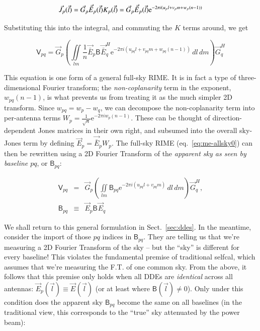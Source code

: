 \documentclass[]{aa}
\newcommand{\herm}{H}
\newcommand{\jones}[2]{\vec {#1}_{#2}}
\newcommand{\jonesT}[2]{\vec {#1}^{\herm}_{#2}}
\newcommand{\coh}[2]{\mathsf{{#1}}_{{#2}}}
\begin{document}
\[
\jones{J}{p}(\vec l) = \jones{G}{p}\jones{\bar E}{p}(\vec l) K_p(\vec l) = \jones{G}{p}\jones{\bar E}{p}(\vec l) {\rm e}^{-2\pi i(u_p l+v_p m+w_p (n-1))}
\]

Substituting this into the integral, and commuting the $K$ terms around, we get

\begin{equation}\label{eq:me-allsky0}
\coh{V}{pq} = \jones{G}{p} \left( \iint\limits_{lm} \frac{1}{n} \jones{\bar E}{p} \coh{B}{} \jonesT{\bar E}{q} \mathrm{e} ^{-2\pi i(u_{pq} l+v_{pq} m+w_{pq} (n-1))} \,dl\,dm \right) \jonesT{G}{q}
\end{equation}

This equation is one form of a general full-sky RIME. It is in fact a type of three-dimensional Fourier transform; the \emph{non-coplanarity} term in the exponent, $w_{pq}(n-1)$, is what prevents us from treating it as the much simpler 2D transform. Since $w_{pq}=w_p-w_q$, we can decompose the non-coplanarity term into per-antenna terms $W_p=\frac{1}{\sqrt{n}} \mathrm{e}^{-2\pi i w_p (n-1)}$. These can be thought of direction-dependent Jones matrices in their own right, and subsumed into the overall sky-Jones term by defining $\jones{E}{p} = \jones{\bar E}{p}W_p$. The full-sky RIME (eq.~\ref{eq:me-allsky0}) can then be rewritten using a 2D Fourier Transform of the \emph{apparent sky as seen by baseline $pq$}, or $\coh{B}{pq}$:

\begin{eqnarray}\label{eq:me-allsky}
\coh{V}{pq} & = & \jones{G}{p} \left( \iint\limits_{lm} \coh{B}{pq} \mathrm{e} ^{-2\pi i(u_{pq} l+v_{pq} m)} \,dl\,dm \right) \jonesT{G}{q}, \\
\nonumber \coh{B}{pq} & \equiv & \jones{E}{p} \coh{B}{} \jones{E}{q}
\end{eqnarray}

We shall return to this general formulation in Sect.~\ref{sec:ddes}. In the meantime, consider the import of those $pq$ indices in $\coh{B}{pq}$. They are telling us that we're measuring a 2D Fourier Transform of the sky -- but the ``sky'' is different for every baseline! This violates the fundamental premise of traditional selfcal, which assumes that we're measuring the F.T. of one common sky. From the above, it follows that this premise only holds when all DDEs are \emph{identical} across all antennas: $\jones{E}{p}(\vec l) \equiv \jones{E}{}(\vec l)$ (or at least where $\coh{B}{}(\vec l) \ne 0$). Only under this condition does the apparent sky $\coh{B}{pq}$ become the same on all baselines (in the traditional view, this corresponds to the ``true'' sky attenuated by the power beam):
\end{document}
